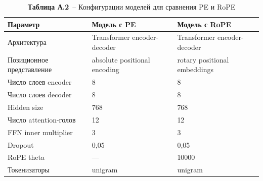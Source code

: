 \begin{table}[H]
	\centering
	\caption*{\textbf{Таблица А.2}~-- Конфигурации моделей для сравнения PE и RoPE}
	\begin{tabularx}{\textwidth}{|p{}|X|X|}
		\hline
		\textbf{Параметр}         & \textbf{Модель с PE}         & \textbf{Модель с RoPE}       \\
		\hline
		Архитектура               & Transformer encoder-decoder  & Transformer encoder-decoder  \\
		\hline
		Позиционное представление & absolute positional encoding & rotary positional embeddings \\
		\hline
		Число слоев encoder       & 8                            & 8                            \\
		\hline
		Число слоев decoder       & 8                            & 8                            \\
		\hline
		Hidden size               & 768                          & 768                          \\
		\hline
		Число attention-голов     & 12                           & 12                           \\
		\hline
		FFN inner multiplier      & 3                            & 3                            \\
		\hline
		Dropout                   & 0{,}05                       & 0{,}05                       \\
		\hline
		RoPE theta                & ---                          & 10000                        \\
		\hline
		Токенизаторы              & unigram                      & unigram                      \\
		\hline
	\end{tabularx}
\end{table}

